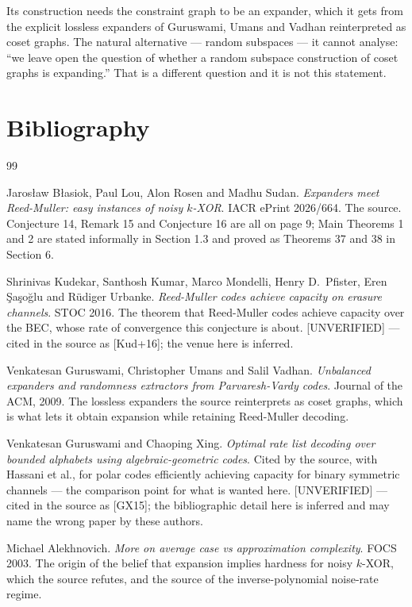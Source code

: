 \documentclass{aicr-conjecture}
\begin{document}
\begin{remark}\label{rem:neighbour}
Its construction needs the constraint graph to be an expander, which it
gets from the explicit lossless expanders of Guruswami, Umans and Vadhan
reinterpreted as coset graphs. The natural alternative --- random subspaces
--- it cannot analyse: ``we leave open the question of whether a random
subspace construction of coset graphs is expanding.'' That is a different
question and it is not this statement.
\end{remark}

\section{Bibliography}

\begin{aicrbibliography}{99}

Jaros\l{}aw B\l{}asiok, Paul Lou, Alon Rosen and Madhu Sudan.
\emph{Expanders meet Reed-Muller: easy instances of noisy $k$-XOR}.
IACR ePrint 2026/664.
The source. Conjecture 14, Remark 15 and Conjecture 16 are all on
page 9; Main Theorems 1 and 2 are stated informally in Section 1.3 and
proved as Theorems 37 and 38 in Section 6.

Shrinivas Kudekar, Santhosh Kumar, Marco Mondelli, Henry D.\ Pfister,
Eren \c{S}a\c{s}o\u{g}lu and R\"udiger Urbanke.
\emph{Reed-Muller codes achieve capacity on erasure channels}.
STOC 2016.
The theorem that Reed-Muller codes achieve capacity over the BEC, whose
rate of convergence this conjecture is about. [UNVERIFIED] --- cited in
the source as [Kud+16]; the venue here is inferred.

Venkatesan Guruswami, Christopher Umans and Salil Vadhan.
\emph{Unbalanced expanders and randomness extractors from
Parvaresh-Vardy codes}.
Journal of the ACM, 2009.
The lossless expanders the source reinterprets as coset graphs, which is
what lets it obtain expansion while retaining Reed-Muller decoding.

Venkatesan Guruswami and Chaoping Xing.
\emph{Optimal rate list decoding over bounded alphabets using algebraic-geometric
codes}.
Cited by the source, with Hassani et al., for polar codes efficiently
achieving capacity for binary symmetric channels --- the comparison point
for what is wanted here. [UNVERIFIED] --- cited in the source as [GX15];
the bibliographic detail here is inferred and may name the wrong paper by
these authors.

Michael Alekhnovich.
\emph{More on average case vs approximation complexity}.
FOCS 2003.
The origin of the belief that expansion implies hardness for noisy
$k$-XOR, which the source refutes, and the source of the
inverse-polynomial noise-rate regime.

\end{aicrbibliography}
\end{document}
